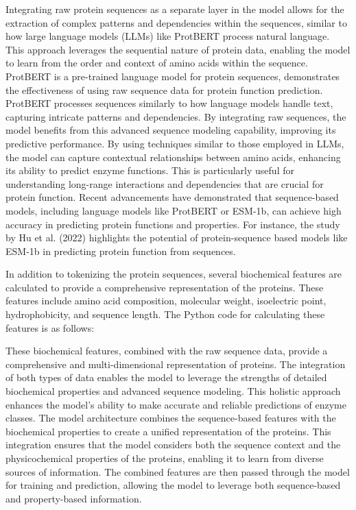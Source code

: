 Integrating raw protein sequences as a separate layer in the model allows for the extraction of complex patterns and dependencies within the sequences, similar to how large language models (LLMs) like ProtBERT process natural language. This approach leverages the sequential nature of protein data, enabling the model to learn from the order and context of amino acids within the sequence. ProtBERT is a pre-trained language model for protein sequences, demonstrates the effectiveness of using raw sequence data for protein function prediction. ProtBERT processes sequences similarly to how language models handle text, capturing intricate patterns and dependencies. By integrating raw sequences, the model benefits from this advanced sequence modeling capability, improving its predictive performance. \autocite{brandesProteinBERTUniversalDeeplearning2022}
By using techniques similar to those employed in LLMs, the model can capture contextual relationships between amino acids, enhancing its ability to predict enzyme functions. This is particularly useful for understanding long-range interactions and dependencies that are crucial for protein function.
Recent advancements have demonstrated that sequence-based models, including language models like ProtBERT or ESM-1b, can achieve high accuracy in predicting protein functions and properties. For instance, the study by Hu et al. (2022) highlights the potential of protein-sequence based models like ESM-1b in predicting protein function from sequences. \autocite{huExploringEvolutionbasedFree2022}

In addition to tokenizing the protein sequences, several biochemical features are calculated to provide a comprehensive representation of the proteins. These features include amino acid composition, molecular weight, isoelectric point, hydrophobicity, and sequence length. The Python code for calculating these features is as follows:

These biochemical features, combined with the raw sequence data, provide a comprehensive and multi-dimensional representation of proteins. The integration of both types of data enables the model to leverage the strengths of detailed biochemical properties and advanced sequence modeling. This holistic approach enhances the model's ability to make accurate and reliable predictions of enzyme classes. The model architecture combines the sequence-based features with the biochemical properties to create a unified representation of the proteins. This integration ensures that the model considers both the sequence context and the physicochemical properties of the proteins, enabling it to learn from diverse sources of information. The combined features are then passed through the model for training and prediction, allowing the model to leverage both sequence-based and property-based information.


